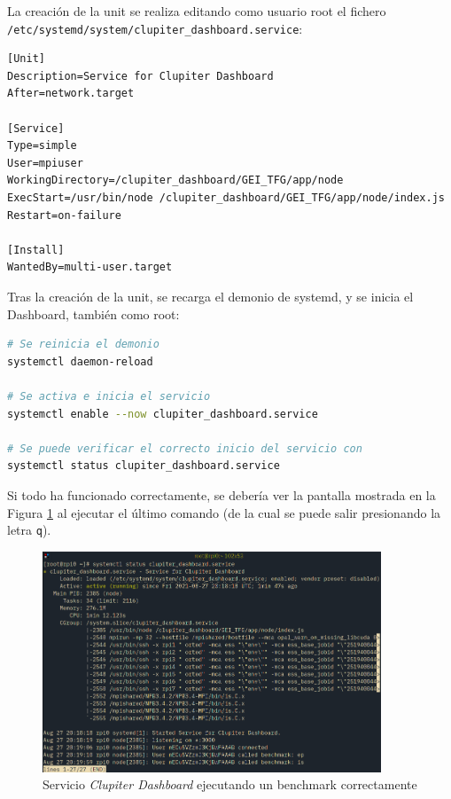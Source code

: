 La creación de la unit se realiza editando como usuario root el fichero \texttt{/etc/systemd/system/clupiter\_dashboard.service}:

\begin{lstlisting}[]
[Unit]
Description=Service for Clupiter Dashboard
After=network.target

[Service]
Type=simple
User=mpiuser
WorkingDirectory=/clupiter_dashboard/GEI_TFG/app/node
ExecStart=/usr/bin/node /clupiter_dashboard/GEI_TFG/app/node/index.js
Restart=on-failure

[Install]
WantedBy=multi-user.target
\end{lstlisting}

Tras la creación de la unit, se recarga el demonio de systemd, y se inicia el Dashboard, también como root:
\begin{lstlisting}[language=bash]
# Se reinicia el demonio
systemctl daemon-reload

# Se activa e inicia el servicio
systemctl enable --now clupiter_dashboard.service

# Se puede verificar el correcto inicio del servicio con
systemctl status clupiter_dashboard.service
\end{lstlisting}

Si todo ha funcionado correctamente, se debería ver la pantalla mostrada en la Figura \ref{fig:systemd_clupiter_dashboard} al ejecutar el último comando (de la cual se puede salir presionando la letra \texttt{q}).

\begin{figure}[h!]
  \centering
  \vspace*{0.5cm}
  \includegraphics[width=0.9\textwidth]{img/systemd_clupiter_dashboard.png}
  \caption{Servicio \textit{Clupiter Dashboard} ejecutando un benchmark correctamente}
  \label{fig:systemd_clupiter_dashboard}
\end{figure}

